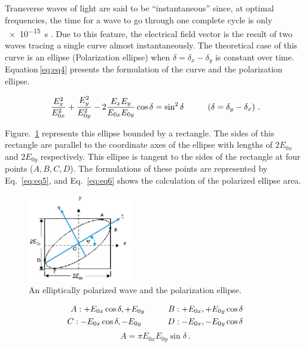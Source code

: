 Transverse waves of light are said to be ``instantaneous'' since, at optimal frequencies, the time for a wave to go through one complete cycle is only \SI{e-15}{\second} \cite{goldstein2003polarized,2006opma.book.....T}.
Due to this feature, the electrical field vector is the result of two waves tracing a single curve almost instantaneously.
The theoretical case of this curve is an ellipse (Polarization ellipse) when $\delta = \delta_{x} - \delta_{y}$ is constant over time.
Equation\,\ref{eq:eq4} presents the formulation of the curve and the polarization ellipse.  

\begin{equation}\label{eq:eq4}
\small
 	\frac{E_{x}^2}{E_{0x}^2} + \frac{E_{y}^2}{E_{0y}^2}-2\frac{E_{x}E_{y}}{E_{0x}E_{0y}}\cos \delta = \sin^2 \delta    \hspace{1cm} (\delta = \delta_{y} - \delta_{x})~.
\end{equation}
 
Figure.~\ref{fig:PolEllipse} represents this ellipse bounded by a rectangle.
The sides of this rectangle are parallel to the coordinate axes of the ellipse with lengths of $2E_{0x}$ and $2E_{0y}$ respectively.
This ellipse is tangent to the sides of the rectangle at four points ($A, B, C, D$).
The formulations of these points are represented by Eq.~\ref{eq:eq5}, and Eq.~\ref{eq:eq6} shows the calculation of the polarized ellipse area. 
\begin{figure}
 \centering
 \includegraphics[width = 0.4\textwidth]{Chapter4/Figures/polellipse.eps}
 \caption{An elliptically polarized wave and the polarization ellipse.}
 \label{fig:PolEllipse}
\end{figure}
 
\begin{eqnarray}\label{eq:eq5}
\small
 	A: +E_{0x} \cos\delta,  +E_{0y} \hspace{1cm}
 	B: +E_{0x},  +E_{0y}\cos\delta \\ \nonumber
 	C: -E_{0x} \cos\delta, -E_{0y}\ \hspace{1cm}
 	D: -E_{0x},  -E_{0y}\cos\delta 	
\end{eqnarray}
\begin{equation}\label{eq:eq6}
	\textit{A} = \pi E_{0x}E_{0y}\sin\delta~.	
\end{equation}

